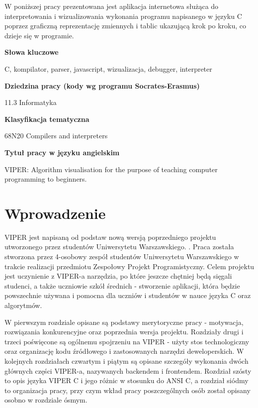 \documentclass[a4paper,twoside,openright,11pt]{report}
\begin{document}
  \begin{titlepage}
  \null\nobreak\vfil
  \begin{center}%
    \bfseries\large \abstractname
  \end{center}
W poniższej pracy prezentowana jest aplikacja internetowa służąca do interpretowania i wizualizowania wykonania programu napisanego w języku C poprzez graficzną reprezentację zmiennych i tablic ukazującą krok po kroku, co dzieje się w programie.  \vspace*{26pt}%
  \begin{center}%
    \bfseries\large Słowa kluczowe
  \end{center}
  C, kompilator, parser, javascript, wizualizacja, debugger, interpreter
  \vspace*{26pt}%
  \begin{center}%
    \bfseries\large Dziedzina pracy (kody wg programu Socrates-Erasmus)
  \end{center}
   11.3 Informatyka
  \vspace*{26pt}%
  \begin{center}%
    \bfseries\large Klasyfikacja tematyczna
  \end{center}
   68N20 Compilers and interpreters
  \vspace*{26pt}%
  \begin{center}%
    \bfseries\large Tytuł pracy w języku angielskim
  \end{center}
  VIPER: Algorithm visualisation for the purpose of teaching computer programming to beginners.
  \nobreak\vfil\null\cleardoublepage
  \end{titlepage}

  \tableofcontents

  \chapter{Wprowadzenie}
\par VIPER jest napisaną od podstaw nową wersją poprzedniego projektu utworzonego przez studentów Uniwersytetu Warszawskiego. \cite{viper1}. Praca została stworzona przez 4-osobowy zespół studentów Uniwersytetu Warszawskiego w trakcie realizacji przedmiotu Zespołowy Projekt Programistyczny. Celem projektu jest uczynienie z VIPER-a narzędzia, po które jeszcze chętniej będą sięgali studenci, a także uczniowie szkół średnich - stworzenie aplikacji, która będzie powszechnie używana i pomocna dla uczniów i studentów w nauce języka C oraz algorytmów. 
\par W pierwszym rozdziale opisane są podstawy merytoryczne pracy - motywacja, rozwiązania konkurencyjne oraz poprzednia wersja projektu. Rozdziały drugi i trzeci poświęcone są ogólnemu spojrzeniu na VIPER - użyty stos technologiczny oraz organizację kodu źródłowego i zastosowanych narzędzi deweloperskich. W kolejnych rozdziałach czwartym i piątym są opisane szczegóły wykonania dwóch głównych części VIPER-a, nazywanych backendem i frontendem. Rozdział szósty to opis języka VIPER C i jego różnic w stosunku do ANSI C, a rozdział siódmy to organizacja pracy, przy czym wkład pracy poszczególnych osób został opisany osobno w rozdziale ósmym.
\end{document}
